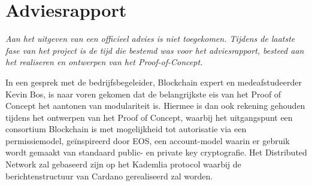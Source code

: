\chapter{Adviesrapport}

\textit{Aan het uitgeven van een officieel advies is niet toegekomen. Tijdens de laatste fase van het project is de tijd die bestemd was voor het adviesrapport, besteed aan het realiseren en ontwerpen van het Proof-of-Concept.}

In een gesprek met de bedrijfsbegeleider, Blockchain expert en medeafstudeerder Kevin Bos, is naar voren gekomen dat de belangrijkste eis van het Proof of Concept het aantonen van modulariteit is. Hiermee is dan ook rekening gehouden tijdens het ontwerpen van het Proof of Concept, waarbij het uitgangspunt een consortium Blockchain is met mogelijkheid tot autorisatie via een permissiemodel, geïnspireerd door EOS, een account-model waarin er gebruik wordt gemaakt van standaard public- en private key cryptografie. Het Distributed Network zal gebaseerd zijn op het Kademlia protocol waarbij de berichtenstructuur van Cardano gerealiseerd zal worden.